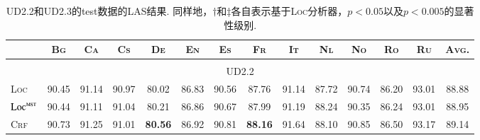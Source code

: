 \begin{table*}[tb]
  \setlength{\tabcolsep}{2.6pt}
  \centering
  \caption{UD2.2和UD2.3的test数据的LAS结果.
    同样地，$\dagger$和$\ddagger$各自表示基于\textsc{Loc}分析器，$p<0.05$以及$p<0.005$的显著性级别.
  }
  \begin{tabularx}{\textwidth}{lccccccccccccc}
    \toprule
                                      & \textsc{Bg}    & \textsc{Ca}    & \textsc{Cs}                      & \textsc{De}                     & \textsc{En}                     & \textsc{Es}                      & \textsc{Fr}                     & \textsc{It}                      & \textsc{Nl}                      & \textsc{No}                     & \textsc{Ro}                      & \textsc{Ru}                      & \textsc{Avg.}                    \\[1pt]
    \midrule
    \\[-15pt]
    \multicolumn{14}{c}{UD2.2}                                                                                                                                                                                                                                                                                                                                                                                                                                       \\[1pt]
    \textsc{Loc}                      & 90.45          & 91.14          & 90.97                            & 80.02                           & 86.83                           & 90.56                            & 87.76                           & 91.14                            & 87.72                            & 90.74                           & 86.20                            & 93.01                            & 88.88                            \\
    $\textsc{Loc}^{\textsc{mst}}$     & 90.44          & 91.11          & 91.04                            & 80.21                           & 86.86                           & 90.67                            & 87.99                           & 91.19                            & 88.24                            & 90.35                           & 86.24                            & 93.01                            & 88.95                            \\
    \textsc{Crf}                      & 90.73          & 91.25          & 91.01                            & \textbf{80.56}\rlap{$^\dagger$} & 86.92                           & 90.81\rlap{$^\dagger$}           & \textbf{88.16}                  & 91.64\rlap{$^\dagger$}           & 88.10                            & 90.85                           & 86.50                            & 93.17\rlap{$^\dagger$}           & 89.14\rlap{$^\ddagger$}          \\

\end{tabularx}
\end{table*}
